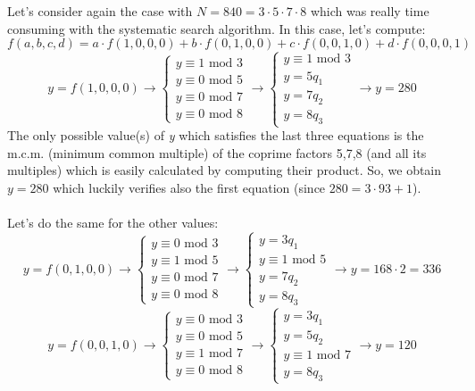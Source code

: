 \documentclass[11pt, a4paper]{article}
\newcommand{\mymod}{
    \text{ mod }
}
\begin{document}
\newpage
\hfill\break
Let's consider again the case with $N=840=3\cdot5\cdot7\cdot8$ which was really time consuming with the systematic search algorithm. In this case, let's compute:
$$f(a,b,c,d)=a\cdot f(1,0,0,0)+b\cdot f(0,1,0,0)+c\cdot f(0,0,1,0)+d\cdot f(0,0,0,1)$$
\begin{equation*}
  y=f(1,0,0,0)\longrightarrow
  \begin{cases}
      y\equiv1\mymod3\\
      y\equiv0\mymod5\\
      y\equiv0\mymod7\\
      y\equiv0\mymod8
  \end{cases}\longrightarrow
  \begin{cases}
      y\equiv1\mymod3\\
      y=5q_1\\
      y=7q_2\\
      y=8q_3
  \end{cases}\longrightarrow
  y=280
\end{equation*}
The only possible value(s) of \textit{y} which satisfies the last three equations is the m.c.m. (minimum common multiple) of the coprime factors 5,7,8 (and all its multiples) which is easily calculated by computing their product. So, we obtain $y=280$ which luckily verifies also the first equation (since $280=3\cdot93+1$).\\\\
Let's do the same for the other values:
\begin{equation*}
  y=f(0,1,0,0)\longrightarrow
  \begin{cases}
      y\equiv0\mymod3\\
      y\equiv1\mymod5\\
      y\equiv0\mymod7\\
      y\equiv0\mymod8
  \end{cases}\longrightarrow
  \begin{cases}
      y=3q_1\\
      y\equiv1\mymod5\\
      y=7q_2\\
      y=8q_3
  \end{cases}\longrightarrow
  y=168\cdot2=336
\end{equation*}
\begin{equation*}
  y=f(0,0,1,0)\longrightarrow
  \begin{cases}
      y\equiv0\mymod3\\
      y\equiv0\mymod5\\
      y\equiv1\mymod7\\
      y\equiv0\mymod8
  \end{cases}\longrightarrow
  \begin{cases}
      y=3q_1\\
      y=5q_2\\
      y\equiv1\mymod7\\
      y=8q_3
  \end{cases}\longrightarrow
  y=120
\end{equation*}
\end{document}
